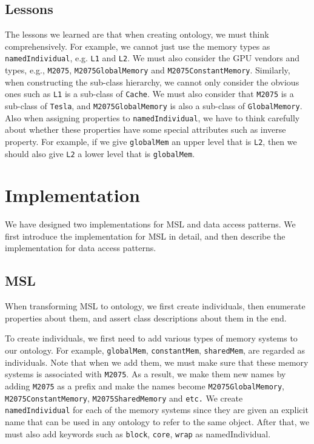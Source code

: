 \documentclass{sig-alternate}
\begin{document}
\subsection{Lessons}
The lessons we learned are that when creating ontology, we must think comprehensively. For example, we cannot just use the memory types as \texttt{namedIndividual}, e.g. \texttt{L1} and \texttt{L2}. We must also consider the GPU vendors and types, e.g., \texttt{M2075}, \texttt{M2075GlobalMemory} and \texttt{M2075ConstantMemory}. Similarly, when constructing the sub-class hierarchy, we cannot only consider the obvious ones such as \texttt{L1} is a sub-class of \texttt{Cache}. We must also consider that \texttt{M2075} is a sub-class of \texttt{Tesla}, and \texttt{M2075GlobalMemory} is also a sub-class of \texttt{GlobalMemory}. Also when assigning properties to \texttt{namedIndividual}, we have to think carefully about whether these properties have some special attributes such as inverse property. For example, if we give \texttt{globalMem} an upper level that is \texttt{L2}, then we should also give \texttt{L2} a lower level that is \texttt{globalMem}. 

\section{Implementation}
We have designed two implementations for MSL and data access patterns. We first introduce the implementation for MSL in detail, and then describe the implementation for data access patterns.

\subsection{MSL}
When transforming MSL to ontology, we first create individuals, then enumerate properties about them, and assert class descriptions about them in the end.

To create individuals, we first need to add various types of memory systems to our ontology. For example, \texttt{globalMem}, \texttt{constantMem}, \texttt{sharedMem}, are regarded as individuals. Note that when we add them, we must make sure that these memory systems is associated with \texttt{M2075}. As a result, we make them new names by adding \texttt{M2075} as a prefix and make the names become \texttt{M2075GlobalMemory}, \texttt{M2075ConstantMemory}, \texttt{M2075SharedMemory} and \texttt{etc.} We create \texttt{namedIndividual} for each of the memory systems since they are given an explicit name that can be used in any ontology to refer to the same object. After that, we must also add keywords such as \texttt{block}, \texttt{core}, \texttt{wrap} as namedIndividual.
\end{document}
